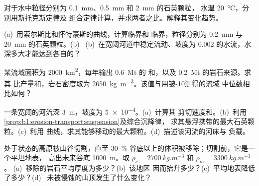 \begin{exercise}[$\star\star$]\label{exo:b1:erosion-transport:7}
对于水中粒径分别为 \qty{0.1}{mm}、\qty{0.5}{mm} 和 \qty{2}{mm} 的石英颗粒，
水温 \qty{20}{\celsius}，分别用斯托克斯定律及
组合定律计算，并求两者之比。解释其变化趋势。
\end{exercise}

\begin{exercise}[$\star\star$]\label{exo:b1:erosion-transport:8}
(a)~用索尔斯比和怀特豪斯的曲线，计算临界和
临界，粒径分别为 \qty{0.2}{mm} 与 \qty{20}{mm} 的石英颗粒。(b)~
(b)~在宽阔河道中稳定流动、坡度为
\num{0.002} 的水流，水深多大才能达到各自的？
\end{exercise}

\begin{exercise}[$\star\star$]\label{exo:b1:erosion-transport:9}
某流域面积为 \qty{2000}{km^2}，每年输出 \qty{0.6}{Mt} 的
和，以及 \qty{0.2}{Mt} 的岩石来源。求其
比产量和，岩石密度取为
\qty{2650}{kg.m^{-3}}。该值与用铍-10测得的流域
中位数相比如何？
\end{exercise}

\begin{exercise}[$\star\star\star$]\label{exo:b1:erosion-transport:10}
一条宽阔的河流深 \qty{3}{m}，坡度为 \num{5e-4}。(a)~计算其
剪切速度和。(b)~利用
\cref{prop:b1:erosion-transport:suspension}及综合沉降律，
求其悬浮携带的最大石英颗粒。(c)~利用
曲线，求其能够移动的最大颗粒。(d)~描述该河流的河床与
负载。
\end{exercise}

\begin{exercise}[$\star\star\star$]\label{exo:b1:erosion-transport:11}
处于状态的高原被山谷切割，直至 \qty{30}{\percent}
谷底以上的体积被移除；切割前，它是一个平坦地表，
高出未来谷底 \qty{1000}{m}。取
$\rho_c = \qty{2700}{kg.m^{-3}}$ 和 $\rho_m = \qty{3300}{kg.m^{-3}}$。
(a)~移除的岩石平均厚度为多少？(b)~该地区
因而抬升多少？(c)~平均地表降低了多少？(d)~
未被侵蚀的山顶发生了什么变化？
\end{exercise}

